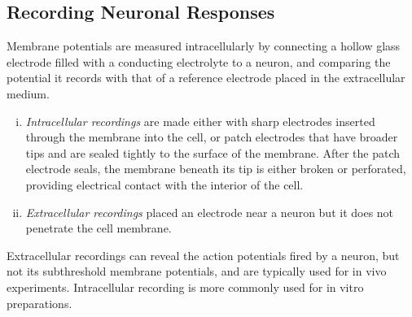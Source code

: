 \subsection{Recording Neuronal Responses}

\begin{rul}
  Membrane potentials are measured intracellularly by connecting a hollow glass electrode filled with a conducting electrolyte to a neuron, and comparing the potential it records with that of a reference electrode placed in the extracellular medium.
  \begin{enumerate}[(i)]
  \item \emph{Intracellular recordings} are made either with sharp electrodes inserted through the membrane into the cell, or patch electrodes that have broader tips and are sealed tightly to the surface of the membrane. After the patch electrode seals, the membrane beneath its tip is either broken or perforated, providing electrical contact with the interior of the cell.
  \item \emph{Extracellular recordings} placed an electrode near a neuron but it does not penetrate the cell membrane.
  \end{enumerate}
\end{rul}

\begin{rem}
  Extracellular recordings can reveal the action potentials fired by a neuron, but not its subthreshold membrane potentials, and are typically used for in vivo experiments. Intracellular recording is more
commonly used for in vitro preparations.
\end{rem}

